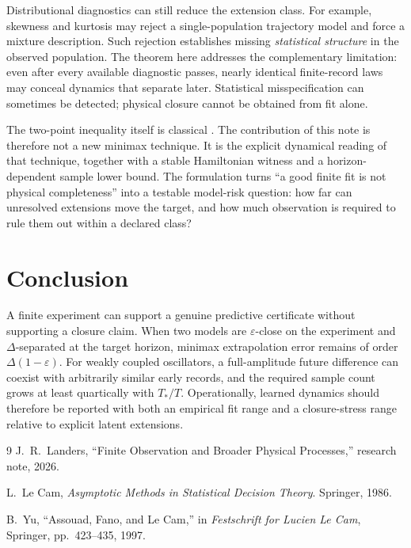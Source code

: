 \documentclass[10pt]{article}
\begin{document}
Distributional diagnostics can still reduce the extension class. For example, skewness and kurtosis may reject a single-population trajectory model and force a mixture description. Such rejection establishes missing \emph{statistical structure} in the observed population. The theorem here addresses the complementary limitation: even after every available diagnostic passes, nearly identical finite-record laws may conceal dynamics that separate later. Statistical misspecification can sometimes be detected; physical closure cannot be obtained from fit alone.

The two-point inequality itself is classical \cite{lecam1986,yu1997}. The contribution of this note is therefore not a new minimax technique. It is the explicit dynamical reading of that technique, together with a stable Hamiltonian witness and a horizon-dependent sample lower bound. The formulation turns ``a good finite fit is not physical completeness'' into a testable model-risk question: how far can unresolved extensions move the target, and how much observation is required to rule them out within a declared class?

\section{Conclusion}

A finite experiment can support a genuine predictive certificate without supporting a closure claim. When two models are $\varepsilon$-close on the experiment and $\Delta$-separated at the target horizon, minimax extrapolation error remains of order $\Delta(1-\varepsilon)$. For weakly coupled oscillators, a full-amplitude future difference can coexist with arbitrarily similar early records, and the required sample count grows at least quartically with $T_*/T$. Operationally, learned dynamics should therefore be reported with both an empirical fit range and a closure-stress range relative to explicit latent extensions.

\begin{thebibliography}{9}\small
\setlength{\itemsep}{1pt}
J.~R.~Landers, ``Finite Observation and Broader Physical Processes,'' research note, 2026.

L.~Le Cam, \emph{Asymptotic Methods in Statistical Decision Theory}. Springer, 1986.

B.~Yu, ``Assouad, Fano, and Le Cam,'' in \emph{Festschrift for Lucien Le Cam}, Springer, pp.~423--435, 1997.
\end{thebibliography}
\end{document}
